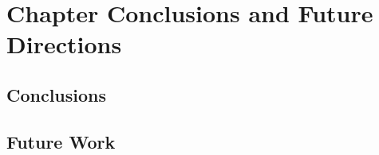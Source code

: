 \chapter{Chapter Conclusions and Future Directions}
\label{sec: Chapter 6}

\section{Conclusions}


\section{Future Work}
\label{sec:future-work}
